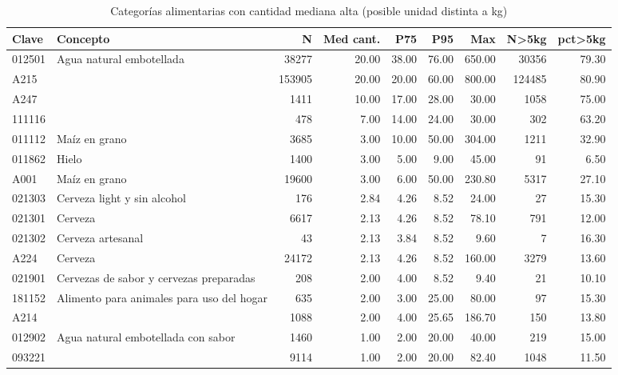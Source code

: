 \begin{table}[ht]
\centering
\caption{Categor\'ias alimentarias con cantidad mediana alta (posible unidad distinta a kg)} 
\label{tab:22_categorias_cantidad_alta}
\begin{tabular}{llrrrrrrr}
  \toprule
Clave & Concepto & N & Med cant. & P75 & P95 & Max & N>5kg & pct>5kg \\ 
  \midrule
012501 & Agua natural embotellada & 38277 & 20.00 & 38.00 & 76.00 & 650.00 & 30356 & 79.30 \\ 
  A215 &  & 153905 & 20.00 & 20.00 & 60.00 & 800.00 & 124485 & 80.90 \\ 
  A247 &  & 1411 & 10.00 & 17.00 & 28.00 & 30.00 & 1058 & 75.00 \\ 
  111116 &  & 478 & 7.00 & 14.00 & 24.00 & 30.00 & 302 & 63.20 \\ 
  011112 & Maíz en grano & 3685 & 3.00 & 10.00 & 50.00 & 304.00 & 1211 & 32.90 \\ 
  011862 & Hielo & 1400 & 3.00 & 5.00 & 9.00 & 45.00 &  91 & 6.50 \\ 
  A001 & Maíz en grano & 19600 & 3.00 & 6.00 & 50.00 & 230.80 & 5317 & 27.10 \\ 
  021303 & Cerveza light y sin alcohol & 176 & 2.84 & 4.26 & 8.52 & 24.00 &  27 & 15.30 \\ 
  021301 & Cerveza & 6617 & 2.13 & 4.26 & 8.52 & 78.10 & 791 & 12.00 \\ 
  021302 & Cerveza artesanal &  43 & 2.13 & 3.84 & 8.52 & 9.60 &   7 & 16.30 \\ 
  A224 & Cerveza & 24172 & 2.13 & 4.26 & 8.52 & 160.00 & 3279 & 13.60 \\ 
  021901 & Cervezas de sabor y cervezas preparadas & 208 & 2.00 & 4.00 & 8.52 & 9.40 &  21 & 10.10 \\ 
  181152 & Alimento para animales para uso del hogar & 635 & 2.00 & 3.00 & 25.00 & 80.00 &  97 & 15.30 \\ 
  A214 &  & 1088 & 2.00 & 4.00 & 25.65 & 186.70 & 150 & 13.80 \\ 
  012902 & Agua natural embotellada con sabor & 1460 & 1.00 & 2.00 & 20.00 & 40.00 & 219 & 15.00 \\ 
  093221 &  & 9114 & 1.00 & 2.00 & 20.00 & 82.40 & 1048 & 11.50 \\ 
   \bottomrule
\end{tabular}
\end{table}
